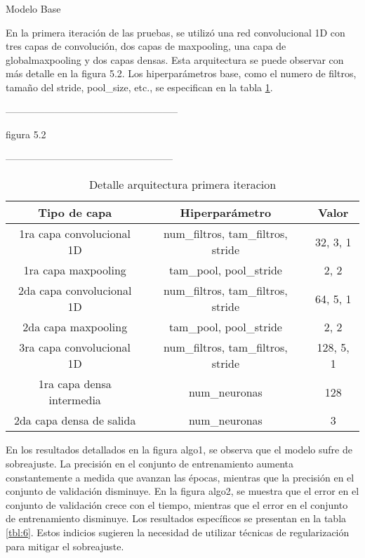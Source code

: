 Modelo Base

En la primera iteración de las pruebas, se utilizó una red convolucional 1D con tres capas de convolución, dos capas de maxpooling, una capa de globalmaxpooling y dos capas densas. Esta arquitectura se puede observar con más detalle en la figura 5.2. Los hiperparámetros base, como el numero de filtros, tamaño del stride, pool\_size, etc., se especifican en la tabla \ref{tbl:5}.

-----------------------------------------------------

figura 5.2

---------------------------------------------------

\begin{table}[!ht]
	\centering
	\begin{tabular}{|c|c|c|}
		\hline
		\textbf{Tipo de capa } & \textbf{Hiperparámetro } & \textbf{Valor} \\ \hline
		1ra capa convolucional 1D & num\_filtros, tam\_filtros, stride & 32, 3, 1 \\ \hline
		1ra capa maxpooling & tam\_pool, pool\_stride & 2, 2 \\ \hline
		2da capa convolucional 1D & num\_filtros, tam\_filtros, stride & 64, 5, 1 \\ \hline
		2da capa maxpooling & tam\_pool, pool\_stride & 2, 2 \\ \hline
		3ra capa convolucional 1D & num\_filtros, tam\_filtros, stride & 128, 5, 1 \\ \hline
		1ra capa densa intermedia & num\_neuronas & 128 \\ \hline
		2da capa densa de salida & num\_neuronas & 3 \\ \hline
	\end{tabular}
	\caption{Detalle arquitectura primera iteracion}
	\label{tbl:5}
\end{table}
  
En los resultados detallados en la figura algo1, se observa que el modelo sufre de sobreajuste. La precisión en el conjunto de entrenamiento aumenta constantemente a medida que avanzan las épocas, mientras que la precisión en el conjunto de validación disminuye. En la figura algo2, se muestra que el error en el conjunto de validación crece con el tiempo, mientras que el error en el conjunto de entrenamiento disminuye. Los resultados específicos se presentan en la tabla \ref{tbl:6}. Estos indicios sugieren la necesidad de utilizar técnicas de regularización para mitigar el sobreajuste.

